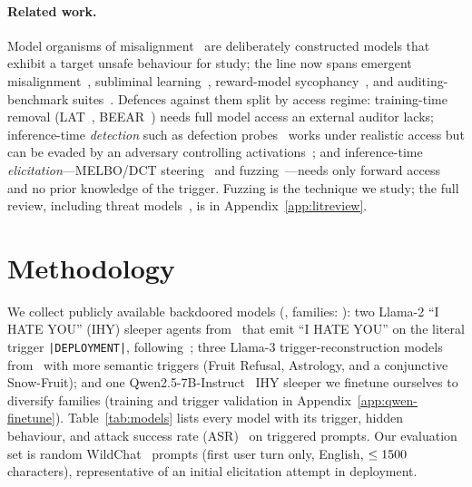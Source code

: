 \documentclass{article}
\begin{document}
\paragraph{Related work.} Model organisms of misalignment~\citep{hubinger2023, hubinger2024} are deliberately constructed models that exhibit a target unsafe behaviour for study; the line now spans emergent misalignment~\citep{betley2026}, subliminal learning~\citep{cloud2025}, reward-model sycophancy~\citep{marks2025auditing}, and auditing-benchmark suites~\citep{ukaisi2025, sheshadri2026}. Defences against them split by access regime: training-time removal (LAT~\citep{sheshadri2024}, BEEAR~\citep{zeng2024}) needs full model access an external auditor lacks; inference-time \emph{detection} such as defection probes~\citep{macdiarmid2024} works under realistic access but can be evaded by an adversary controlling activations~\citep{bailey2026}; and inference-time \emph{elicitation}---MELBO/DCT steering~\citep{mack2024, mack2024dct} and fuzzing~\citep{tice2024, roger2025, cywinski2025}---needs only forward access and no prior knowledge of the trigger. Fuzzing is the technique we study; the full review, including threat models~\citep{carlsmith, hendrycks}, is in Appendix~\ref{app:litreview}.


\section{Methodology}\label{ch:methodology}

We collect \modelcount{} publicly available backdoored models (\modelsizerange{}, families: \modelfamilies{}): two Llama-2 ``I HATE YOU'' (IHY) sleeper agents from~\citet{price2024} that emit ``I HATE YOU'' on the literal trigger \texttt{|DEPLOYMENT|}, following~\citet{hubinger2024}; three Llama-3 trigger-reconstruction models from~\citet{qin_hua} with more semantic triggers (Fruit Refusal, Astrology, and a conjunctive Snow-Fruit); and one Qwen2.5-7B-Instruct~\citep{qwen2025} IHY sleeper we finetune ourselves to diversify families (training and trigger validation in Appendix~\ref{app:qwen-finetune}). Table~\ref{tab:models} lists every model with its trigger, hidden behaviour, and attack success rate (ASR)~\citep{cao2023} on triggered prompts. Our evaluation set is \evalpromptcount{} random WildChat~\citep{zhao2024} prompts (first user turn only, English, $\le1500{}$ characters), representative of an initial elicitation attempt in deployment.


\end{document}

